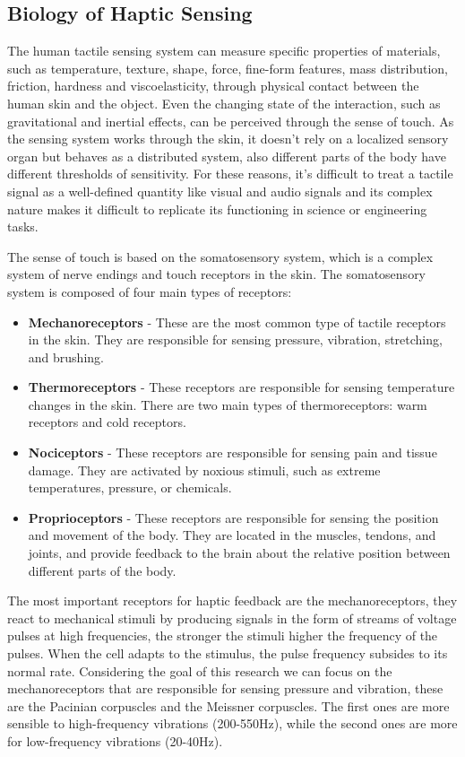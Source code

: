\subsection{Biology of Haptic Sensing}
The human tactile sensing system can measure specific properties of materials, such as
temperature, texture, shape, force, fine-form features, mass distribution, friction, hardness
and viscoelasticity, through physical contact between the human skin and the object.
Even the changing state of the interaction, such as gravitational and inertial effects, can
be perceived through the sense of touch. 
As the sensing system works through the skin, it doesn't rely on a localized sensory organ but behaves as a distributed system, also different parts of the body have different thresholds of sensitivity.
For these reasons, it's difficult to treat a tactile signal as a well-defined quantity like visual and
audio signals and its complex nature makes it difficult to replicate its functioning in
science or engineering tasks.

The sense of touch is based on the somatosensory system, which is a complex system of nerve endings and touch receptors in the skin. The somatosensory system is composed of four main types of receptors:
\begin{itemize}
    \item \textbf{Mechanoreceptors} - These are the most common type of tactile receptors in the skin. They are responsible for sensing pressure, vibration, stretching, and brushing.
    \item \textbf{Thermoreceptors} - These receptors are responsible for sensing temperature changes in the skin. There are two main types of thermoreceptors: warm receptors and cold receptors.
    \item \textbf{Nociceptors} - These receptors are responsible for sensing pain and tissue damage. They are activated by noxious stimuli, such as extreme temperatures, pressure, or chemicals.
    \item \textbf{Proprioceptors} - These receptors are responsible for sensing the position and movement of the body. They are located in the muscles, tendons, and joints, and provide feedback to the brain about the relative position between different parts of the body.
\end{itemize}

The most important receptors for haptic feedback are the mechanoreceptors, they react to mechanical stimuli by producing signals in the form of streams of voltage pulses at high frequencies, the stronger the stimuli higher the frequency of the pulses. When the cell adapts to the stimulus, the pulse frequency subsides to its normal rate.
Considering the goal of this research we can focus on the mechanoreceptors that are responsible for sensing pressure and vibration, these are the Pacinian corpuscles and the Meissner corpuscles.
The first ones are more sensible to high-frequency vibrations (200-550Hz), while the second ones are more for low-frequency vibrations (20-40Hz). \cite{Alg_Wearable_Tech_Nicole}